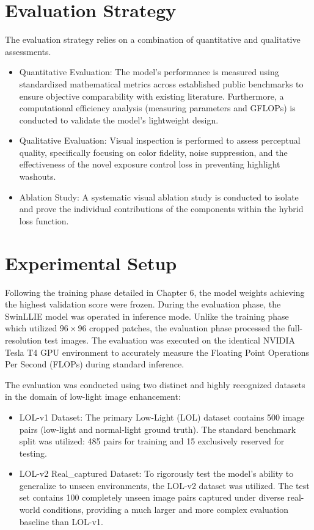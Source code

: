 \documentclass[12pt, a4paper]{report}
\begin{document}
\section{Evaluation Strategy}
The evaluation strategy relies on a combination of quantitative and qualitative assessments.
\begin{itemize}
    \item Quantitative Evaluation: The model's performance is measured using standardized mathematical metrics across established public benchmarks to ensure objective comparability with existing literature. Furthermore, a computational efficiency analysis (measuring parameters and GFLOPs) is conducted to validate the model's lightweight design.
    \item Qualitative Evaluation: Visual inspection is performed to assess perceptual quality, specifically focusing on color fidelity, noise suppression, and the effectiveness of the novel exposure control loss in preventing highlight washouts.
    \item Ablation Study: A systematic visual ablation study is conducted to isolate and prove the individual contributions of the components within the hybrid loss function.
\end{itemize}

\section{Experimental Setup}
Following the training phase detailed in Chapter 6, the model weights achieving the highest validation score were frozen. During the evaluation phase, the SwinLLIE model was operated in inference mode. Unlike the training phase which utilized $96 \times 96$ cropped patches, the evaluation phase processed the full-resolution test images. The evaluation was executed on the identical NVIDIA Tesla T4 GPU environment to accurately measure the Floating Point Operations Per Second (FLOPs) during standard inference.

The evaluation was conducted using two distinct and highly recognized datasets in the domain of low-light image enhancement:
\begin{itemize}
    \item LOL-v1 Dataset: The primary Low-Light (LOL) dataset contains 500 image pairs (low-light and normal-light ground truth). The standard benchmark split was utilized: 485 pairs for training and 15 exclusively reserved for testing.
    \item LOL-v2 Real\_captured Dataset: To rigorously test the model's ability to generalize to unseen environments, the LOL-v2 dataset was utilized. The test set contains 100 completely unseen image pairs captured under diverse real-world conditions, providing a much larger and more complex evaluation baseline than LOL-v1.
\end{itemize}
\end{document}
